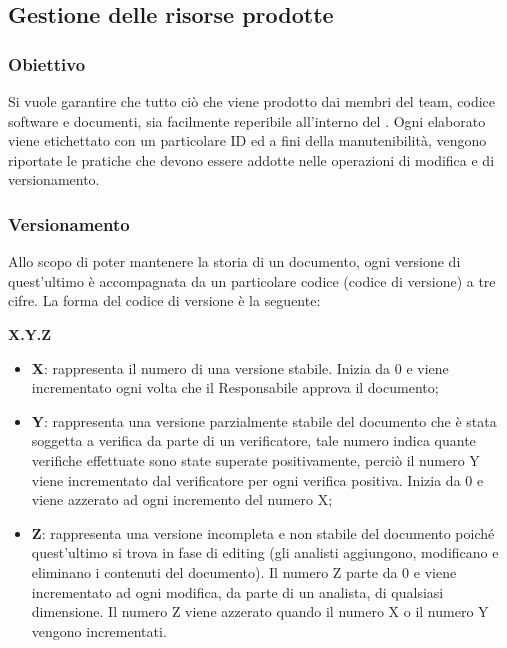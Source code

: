 \subsection{Gestione delle risorse prodotte}
\subsubsection{Obiettivo}

Si vuole garantire che tutto ciò che viene prodotto dai membri del team, codice software e documenti, sia facilmente reperibile all’interno del . Ogni elaborato viene etichettato con un particolare ID ed a fini della manutenibilità, vengono riportate le pratiche che devono essere addotte nelle operazioni di modifica e di versionamento.

\subsubsection{Versionamento}
Allo scopo di poter mantenere la storia di un documento, ogni versione di quest'ultimo è accompagnata da un particolare codice (codice di versione) a tre cifre. La forma del codice di versione è la seguente:
\begin{center}
	\textbf{X.Y.Z}
\end{center}
\begin{itemize}
\item \textbf{X}: rappresenta il numero di una versione stabile. Inizia da 0 e viene incrementato ogni volta che il Responsabile approva il documento;
\item \textbf{Y}: rappresenta una versione parzialmente stabile del documento che è stata soggetta a verifica da parte di un verificatore, tale numero indica quante verifiche effettuate sono state superate positivamente, perciò il numero Y viene incrementato dal verificatore per ogni verifica positiva. Inizia da 0 e viene azzerato ad ogni incremento del numero X;
\item \textbf{Z}: rappresenta una versione incompleta e non stabile del documento poiché quest'ultimo si trova in fase di editing (gli analisti aggiungono, modificano e eliminano i contenuti del documento). Il numero Z parte da 0 e viene incrementato ad ogni modifica, da parte di un analista, di qualsiasi dimensione. Il numero Z viene azzerato quando il numero X o il numero Y vengono incrementati.
\end{itemize}

